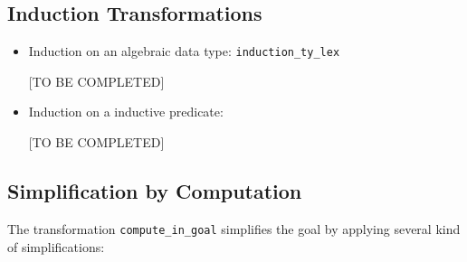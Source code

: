 \subsection{Induction Transformations}

\begin{itemize}
\item Induction on an algebraic data type: \verb|induction_ty_lex|

[TO BE COMPLETED]

\item Induction on a inductive predicate:

[TO BE COMPLETED]

\end{itemize}

\subsection{Simplification by Computation}

The transformation \verb|compute_in_goal| simplifies the goal by applying several kind of simplifications:

